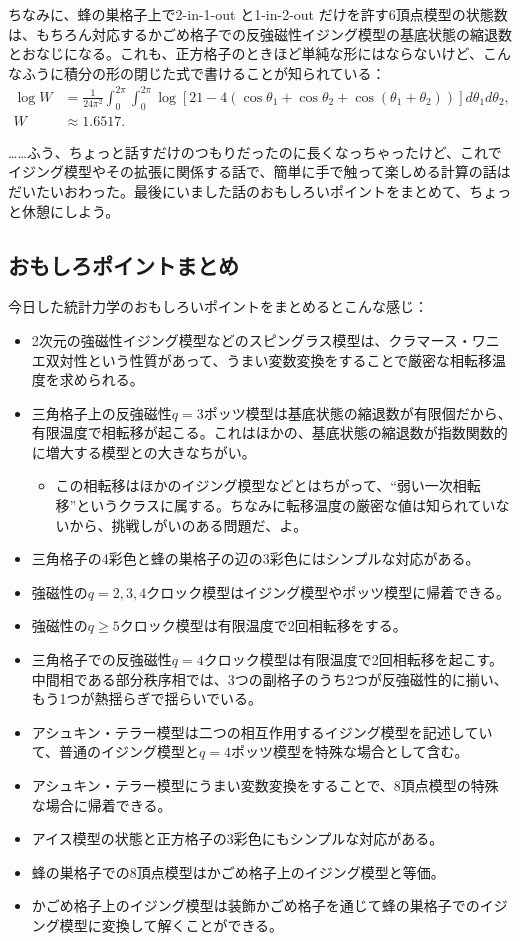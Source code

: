 \documentclass[paper=b5j,fontsize=12Q,jafontsize=12Q,baselineskip=21Q]{jlreq}
\begin{document}
\begin{refsection}
ちなみに、蜂の巣格子上で2-in-1-out と1-in-2-out だけを許す6頂点模型の状態数は、もちろん対応するかごめ格子での反強磁性イジング模型の基底状態の縮退数とおなじになる。これも、正方格子のときほど単純な形にはならないけど、こんなふうに積分の形の閉じた式で書けることが知られている：
\begin{align}
  \log W &= \frac{1}{24\pi^2} \int_0^{2\pi} \int_0^{2\pi} \log \left[ 21 - 4(\cos \theta_1 + \cos \theta_2 + \cos(\theta_1 + \theta_2)) \right] d\theta_1 d\theta_2,\\
  W &\approx 1.6517.
\end{align}

……ふう、ちょっと話すだけのつもりだったのに長くなっちゃったけど、これでイジング模型やその拡張に関係する話で、簡単に手で触って楽しめる計算の話はだいたいおわった。最後にいました話のおもしろいポイントをまとめて、ちょっと休憩にしよう。

\subsection{おもしろポイントまとめ}
今日した統計力学のおもしろいポイントをまとめるとこんな感じ：
\begin{itemize}
  \item 2次元の強磁性イジング模型などのスピングラス模型は、クラマース・ワニエ双対性という性質があって、うまい変数変換をすることで厳密な相転移温度を求められる。
  \item 三角格子上の反強磁性$q=3$ポッツ模型は基底状態の縮退数が有限個だから、有限温度で相転移が起こる。これはほかの、基底状態の縮退数が指数関数的に増大する模型との大きなちがい。
  \begin{itemize}
    \item この相転移はほかのイジング模型などとはちがって、``弱い一次相転移''というクラスに属する。ちなみに転移温度の厳密な値は知られていないから、挑戦しがいのある問題だ、よ。
  \end{itemize}
  \item 三角格子の4彩色と蜂の巣格子の辺の3彩色にはシンプルな対応がある。
  \item 強磁性の$q=2,3,4$クロック模型はイジング模型やポッツ模型に帰着できる。
  \item 強磁性の$q\ge5$クロック模型は有限温度で2回相転移をする。
  \item 三角格子での反強磁性$q=4$クロック模型は有限温度で2回相転移を起こす。中間相である部分秩序相では、3つの副格子のうち2つが反強磁性的に揃い、もう1つが熱揺らぎで揺らいでいる。
  \item アシュキン・テラー模型は二つの相互作用するイジング模型を記述していて、普通のイジング模型と$q=4$ポッツ模型を特殊な場合として含む。
  \item アシュキン・テラー模型にうまい変数変換をすることで、8頂点模型の特殊な場合に帰着できる。
  \item アイス模型の状態と正方格子の3彩色にもシンプルな対応がある。
  \item 蜂の巣格子での8頂点模型はかごめ格子上のイジング模型と等価。
  \item かごめ格子上のイジング模型は装飾かごめ格子を通じて蜂の巣格子でのイジング模型に変換して解くことができる。
\end{itemize}


\end{refsection}
\end{document}
